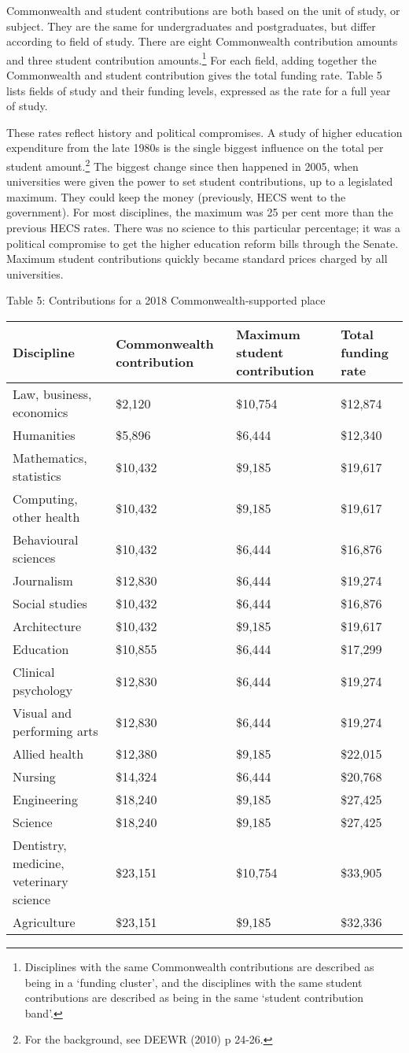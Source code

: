 \documentclass[]{book}
\begin{document}
Commonwealth and student contributions are both based on the unit of study, or subject. They are the same for undergraduates and postgraduates, but differ according to field of study. There are eight Commonwealth contribution amounts and three student contribution amounts.\footnote{Disciplines with the same Commonwealth contributions are described as being in a `funding cluster', and the disciplines with the same student contributions are described as being in the same `student contribution band'.} For each field, adding together the Commonwealth and student contribution gives the total funding rate. Table 5 lists fields of study and their funding levels, expressed as the rate for a full year of study.

These rates reflect history and political compromises. A study of higher education expenditure from the late 1980s is the single biggest influence on the total per student amount.\footnote{For the background, see DEEWR (2010) p 24-26.} The biggest change since then happened in 2005, when universities were given the power to set student contributions, up to a legislated maximum. They could keep the money (previously, HECS went to the government). For most disciplines, the maximum was 25 per cent more than the previous HECS rates. There was no science to this particular percentage; it was a political compromise to get the higher education reform bills through the Senate. Maximum student contributions quickly became standard prices charged by all universities.

\protect\hypertarget{_Ref311742121}{}{}Table 5: Contributions for a 2018 Commonwealth-supported place

\begin{longtable}[]{@{}llll@{}}
\toprule
\textbf{Discipline} & \textbf{Commonwealth contribution} & \textbf{Maximum student contribution } & \textbf{Total funding rate }\tabularnewline
\midrule
\endhead
Law, business, economics & \$2,120 & \$10,754 & \$12,874\tabularnewline
Humanities & \$5,896 & \$6,444 & \$12,340\tabularnewline
Mathematics, statistics & \$10,432 & \$9,185 & \$19,617\tabularnewline
Computing, other health & \$10,432 & \$9,185 & \$19,617\tabularnewline
Behavioural sciences & \$10,432 & \$6,444 & \$16,876\tabularnewline
Journalism & \$12,830 & \$6,444 & \$19,274\tabularnewline
Social studies & \$10,432 & \$6,444 & \$16,876\tabularnewline
Architecture & \$10,432 & \$9,185 & \$19,617\tabularnewline
Education & \$10,855 & \$6,444 & \$17,299\tabularnewline
Clinical psychology & \$12,830 & \$6,444 & \$19,274\tabularnewline
Visual and performing arts & \$12,830 & \$6,444 & \$19,274\tabularnewline
Allied health & \$12,380 & \$9,185 & \$22,015\tabularnewline
Nursing & \$14,324 & \$6,444 & \$20,768\tabularnewline
Engineering & \$18,240 & \$9,185 & \$27,425\tabularnewline
Science & \$18,240 & \$9,185 & \$27,425\tabularnewline
Dentistry, medicine, veterinary science & \$23,151 & \$10,754 & \$33,905\tabularnewline
Agriculture & \$23,151 & \$9,185 & \$32,336\tabularnewline
\bottomrule
\end{longtable}
\end{document}
